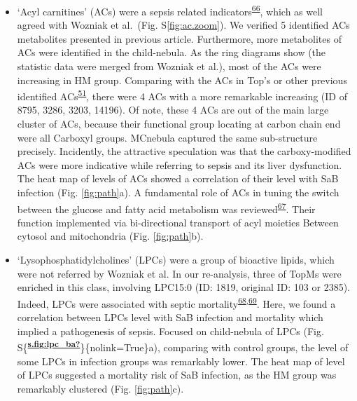 \begin{itemize}
\item
  `Acyl carnitines' (ACs) were a sepsis related
  indicators\textsuperscript{\protect\hyperlink{ref-2018bc}{66}}, which
  as well agreed with Wozniak et al.~(Fig.
  S{\protect\NoHyper\ref{fig:ac.zoom}\protect\endNoHyper}). We verified
  5 identified ACs metabolites presented in previous article.
  Furthermore, more metabolites of ACs were identified in the
  child-nebula. As the ring diagrams show (the statistic data were
  merged from Wozniak et al.), most of the ACs were increasing in HM
  group. Comparing with the ACs in Top's or other previous identified
  ACs\textsuperscript{\protect\hyperlink{ref-2020s}{51}}, there were 4
  ACs with a more remarkable increasing (ID of 8795, 3286, 3203, 14196).
  Of note, these 4 ACs are out of the main large cluster of ACs, because
  their functional group locating at carbon chain end were all Carboxyl
  groups. MCnebula captured the same sub-structure precisely.
  Incidently, the attractive speculation was that the carboxy-modified
  ACs were more indicative while referring to sepsis and its liver
  dysfunction. The heat map of levels of ACs showed a correlation of
  their level with SaB infection (Fig.
  {\protect\NoHyper\ref{fig:path}\protect\endNoHyper}a). A fundamental
  role of ACs in tuning the switch between the glucose and fatty acid
  metabolism was
  reviewed\textsuperscript{\protect\hyperlink{ref-2018bi}{67}}. Their
  function implemented via bi-directional transport of acyl moieties
  Between cytosol and mitochondria (Fig.
  {\protect\NoHyper\ref{fig:path}\protect\endNoHyper}b).
\item
  `Lysophosphatidylcholines' (LPCs) were a group of bioactive lipids,
  which were not referred by Wozniak et al. In our re-analysis, three of
  TopMs were enriched in this class, involving LPC15:0 (ID: 1819,
  original ID: 103 or 2385). Indeed, LPCs were associated with septic
  mortality\textsuperscript{\protect\hyperlink{ref-2003n}{68},\protect\hyperlink{ref-2014ao}{69}}.
  Here, we found a correlation between LPCs level with SaB infection and
  mortality which implied a pathogenesis of sepsis. Focused on
  child-nebula of LPCs (Fig.
  S\{\textsuperscript{\protect\hyperlink{ref-s.fig:lpc_ba}{\textbf{s.fig:lpc\_ba?}}}\}\{nolink=True\}a),
  comparing with control groups, the level of some LPCs in infection
  groups was remarkably lower. The heat map of level of LPCs suggested a
  mortality risk of SaB infection, as the HM group was remarkably
  clustered (Fig. {\protect\NoHyper\ref{fig:path}\protect\endNoHyper}c).

\end{itemize}
